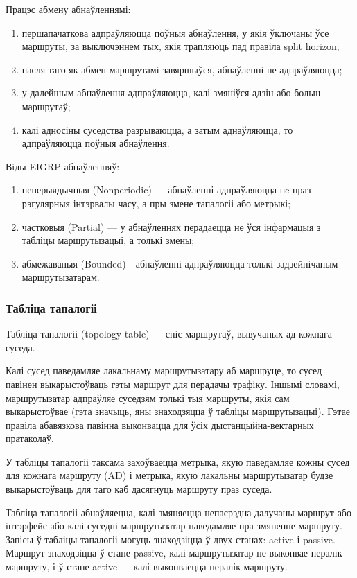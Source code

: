 Працэс абмену абнаўленнямі:
\begin{enumerate}
    \item першапачаткова адпраўляюцца поўныя абнаўлення, у якія ўключаны ўсе маршруты, за выключэннем тых, якія трапляюць пад правіла split horizon;
    \item пасля таго як абмен маршрутамі завяршыўся, абнаўленні не адпраўляюцца;
    \item у далейшым абнаўлення адпраўляюцца, калі змяніўся адзін або больш маршрутаў;
    \item калі адносіны суседства разрываюцца, а затым аднаўляюцца, то адпраўляюцца поўныя абнаўлення.
\end{enumerate}

Віды EIGRP абнаўленняў:
\begin{enumerate}
    \item неперыядычныя (Nonperiodic) --- абнаўленні адпраўляюцца нe праз рэгулярныя інтэрвалы часу, а пры змене тапалогіі або метрыкі;
    \item частковыя (Partial) --- у абнаўленнях перадаецца не ўся інфармацыя з табліцы маршрутызацыі, а толькі змены;
    \item абмежаваныя (Bounded) - абнаўленні адпраўляюцца толькі задзейнічаным маршрутызатарам.
\end{enumerate}

\subsubsection{Табліца тапалогіі}

Табліца тапалогіі (topology table) --- спіс маршрутаў, вывучаных ад кожнага суседа.

Калі сусед паведамляе лакальнаму маршрутызатару аб маршруце, то сусед павінен выкарыстоўваць гэты маршрут для перадачы трафіку. Іншымі словамі, маршрутызатар адпраўляе суседзям толькі тыя маршруты, якія сам выкарыстоўвае (гэта значыць, яны знаходзяцца ў табліцы маршрутызацыі).
Гэтае правіла абавязкова павінна выконвацца для ўсіх дыстанцыйна-вектарных пратаколаў.

У табліцы тапалогіі таксама захоўваецца метрыка, якую паведамляе кожны сусед для кожнага маршруту (AD) і метрыка, якую лакальны маршрутызатар будзе выкарыстоўваць для таго каб дасягнуць маршруту праз суседа.

Табліца тапалогіі абнаўляецца, калі змяняецца непасрэдна далучаны маршрут або інтэрфейс або калі суседні маршрутызатар паведамляе пра змяненне маршруту.
Запісы ў табліцы тапалогіі могуць знаходзіцца ў двух станах: active і passive.
Маршрут знаходзіцца ў стане passive, калі маршрутызатар не выконвае пералік маршруту, і ў стане active --- калі выконваецца пералік маршруту.

